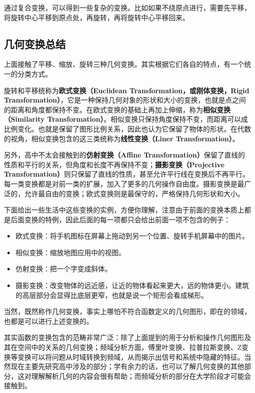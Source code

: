 通过复合变换，可以得到一些复杂的变换。比如如果不绕原点进行，需要先平移，将旋转中心平移到原点处，再旋转，再将旋转中心平移回来。

\subsection{几何变换总结}

上面接触了平移、缩放、旋转三种几何变换。其实根据它们各自的特点，有一个统一的分类方式。

旋转和平移统称为\textbf{欧式变换（Euclidean Transformation，或刚体变换，Rigid Transformation）}，它是一种保持几何对象的形状和大小的变换，也就是点之间的距离和角度都保持不变。在欧式变换的基础上再加上伸缩，称为\textbf{相似变换（Similarity Transformation）}。相似变换只保持角度保持不变，而距离可以成比例变化。也就是保留了图形比例关系，因此也认为它保留了物体的形状。在代数的视角，相似变换包含的这三类统称为\textbf{线性变换（Liner Transformation）}。

另外，高中不太会接触到的\textbf{仿射变换（Affine Transformation）}保留了直线的性质和平行的关系，但角度和长度不再保持不变；\textbf{摄影变换（Projective Transformation）}则只保留了直线的性质，甚至允许平行线在变换后不再平行。每一类变换都是对前一类的扩展，加入了更多的几何操作自由度。摄影变换是最广泛的，允许最自由的变换；欧式变换则是最保守的，严格保持几何形状和大小。

下面给出一些生活中这些变换的实例，方便你理解，注意由于前面的变换本质上都是后面变换的特例，因此后面的每一项都只会给出前面一项不包含的例子：

\begin{itemize}
\item 欧式变换：将手机图标在屏幕上拖动到另一个位置、旋转手机屏幕中的图片。
\item 相似变换：缩放地图应用中的视图。
\item 仿射变换：把一个字变成斜体。
\item 摄影变换：改变物体的远近感，让近的物体看起来更大，远的物体更小。建筑的高层部分会显得比底层更窄，也就是说一个矩形会看成梯形。
\end{itemize}

当然，既然称作几何变换，事实上哪怕不符合函数定义的几何图形，即在的领域，也都是可以进行上述变换的。

其实函数的变换包含的范畴非常广泛：除了上面提到的用于分析和操作几何图形及其在空间中的关系的几何变换；频域分析方面，傅里叶变换、拉普拉斯变换、Z变换等变换可以将问题从时域转换到频域，从而揭示出信号和系统中隐藏的特征。当然现在主要先研究高中涉及的部分；学有余力的话，也可以了解几何变换的其他部分，这对理解解析几何的内容会很有帮助；而频域分析的部分在大学阶段才可能会接触到。
